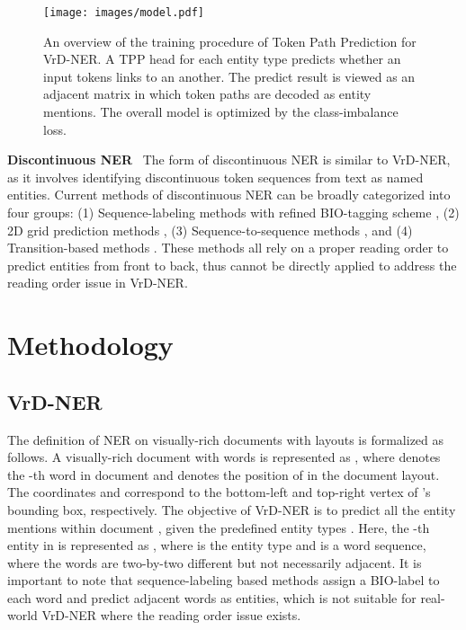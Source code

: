 \documentclass[11pt]{article}
\begin{document}
\begin{figure*}[t]
    \centering
\texttt{[image: images/model.pdf]}        
    \caption{
        An overview of the training procedure of Token Path Prediction for VrD-NER. A TPP head for each entity type predicts whether an input tokens links to an another. The predict result is viewed as an adjacent matrix in which token paths are decoded as entity mentions. The overall model is optimized by the class-imbalance loss. }
\label{fig:model}
\end{figure*}

\noindent \textbf{Discontinuous NER} \ 
The form of discontinuous NER is similar to VrD-NER, as it involves identifying discontinuous token sequences from text as named entities.
Current methods of discontinuous NER can be broadly categorized into four groups: (1) Sequence-labeling methods with refined BIO-tagging scheme \citep{tang2015recognizing,dirkson2021fuzzybio}, (2) 2D grid prediction methods \citep{wang2021discontinuous,li2022unified,liu2022toe}, (3) Sequence-to-sequence methods \citep{li2021span,he2022setgner}, and (4) Transition-based methods \citep{dai2020effective}. These methods all rely on a proper reading order to predict entities from front to back, thus cannot be directly applied to address the reading order issue in VrD-NER. 

\section{Methodology}

\subsection{VrD-NER}

The definition of NER on visually-rich documents with layouts is formalized as follows. 
A visually-rich document with  words is represented as , where  denotes the -th word in document and  denotes the position of  in the document layout. The coordinates  and  correspond to the bottom-left and top-right vertex of 's bounding box, respectively. 
The objective of VrD-NER is to predict all the entity mentions  within document , given the predefined entity types . 
Here, the -th entity in  is represented as , where  is the entity type and  is a word sequence, where the words are two-by-two different but not necessarily adjacent. It is important to note that sequence-labeling based methods assign a BIO-label to each word and predict adjacent words  as entities, which is not suitable for real-world VrD-NER where the reading order issue exists. 
\end{document}
